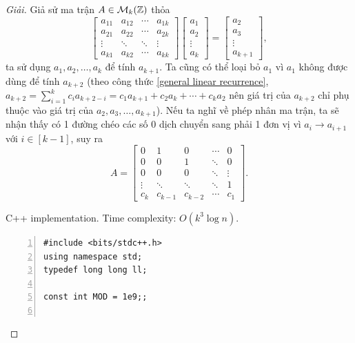 \documentclass{article}
\begin{document}
\begin{proof}[Giải]
    Giả sử ma trận $A\in{\cal M}_k(\mathbb{Z})$ thỏa
    \begin{equation*}
        \begin{bmatrix}
            a_{11} & a_{12} & \cdots & a_{1k}\\a_{21} & a_{22} & \cdots & a_{2k}\\\vdots & \ddots & \ddots & \vdots\\a_{k1} & a_{k2} & \cdots & a_{kk}
        \end{bmatrix}\begin{bmatrix}
            a_1\\a_2\\\vdots\\a_k
        \end{bmatrix} = \begin{bmatrix}
            a_2\\a_3\\\vdots\\a_{k + 1}
        \end{bmatrix},
    \end{equation*}
    ta sử dụng $a_1,a_2,\ldots,a_k$ để tính $a_{k + 1}$. Ta cũng có thể loại bỏ $a_1$ vì $a_1$ không được dùng để tính $a_{k + 2}$ (theo công thức \eqref{general linear recurrence}, $a_{k + 2} = \sum_{i=1}^k c_ia_{k + 2 - i} = c_1a_{k + 1} + c_2a_k + \cdots + c_ka_2$ nên giá trị của $a_{k + 2}$ chỉ phụ thuộc vào giá trị của $a_2,a_3,\ldots,a_{k + 1}$). Nếu ta nghĩ về phép nhân ma trận, ta sẽ nhận thấy có 1 đường chéo các số 0 dịch chuyển sang phải 1 đơn vị vì $a_i\to a_{i + 1}$ với $i\in[k - 1]$, suy ra
    \begin{equation*}
        A = \begin{bmatrix}
            0 & 1 & 0 & \cdots & 0\\0 & 0 & 1 & \ddots & 0\\ 0 & 0 & 0 & \ddots & \vdots\\\vdots & \ddots & \ddots & \ddots & 1\\c_k & c_{k - 1} & c_{k - 2} & \cdots & c_1
        \end{bmatrix}.
    \end{equation*}
    \item {\sf C++ implementation.} Time complexity: $O(k^3\log n)$.
    \begin{Verbatim}[numbers=left,xleftmargin=0mm]
#include <bits/stdc++.h>
using namespace std;
typedef long long ll;

const int MOD = 1e9;;


\end{Verbatim}
\end{proof}
\end{document}
